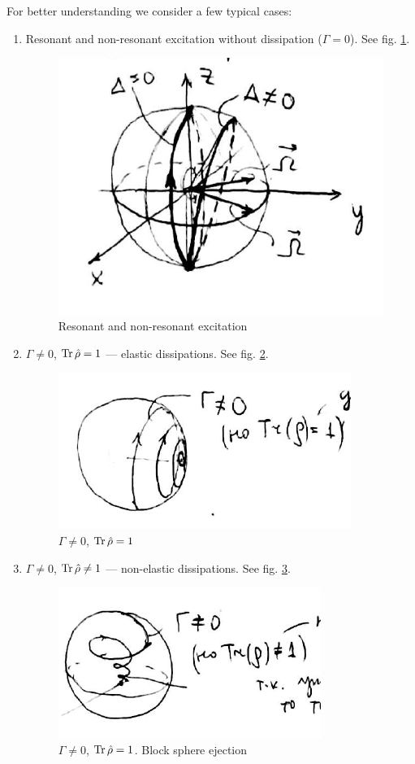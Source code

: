 For better understanding we consider a few typical cases: 
\begin{enumerate}
	\item Resonant and non-resonant excitation without dissipation ($\Gamma = 0$). See fig. \ref{fig:bloch1}.
	\begin{figure}[h!]
		\centering
		\includegraphics[width=0.7\linewidth]{fig/L5/bloch1}
		\caption{Resonant and non-resonant excitation}
		\label{fig:bloch1}
	\end{figure}
	\item $\Gamma \neq 0$, $\operatorname{Tr} \hat{\rho} = 1$ --- elastic dissipations. See fig. \ref{fig:gammanenol1}.
	\begin{figure}[h!]
		\centering
		\includegraphics[width=0.6\linewidth]{fig/L5/gamma_ne_nol_1}
		\caption{$\Gamma \neq 0$, $\operatorname{Tr} \hat{\rho} = 1$}
		\label{fig:gammanenol1}
	\end{figure}
	\item $\Gamma \neq 0$, $\operatorname{Tr} \hat{\rho} \neq 1$ --- non-elastic dissipations. See fig. \ref{fig:gammanenol}.
	\begin{figure}[h!]
		\centering
		\includegraphics[width=0.6\linewidth]{fig/L5/gamma_ne_nol}
		\caption{$\Gamma \neq 0$, $\operatorname{Tr} \hat{\rho} = 1$. Block sphere ejection}
		\label{fig:gammanenol}
	\end{figure}
	
	
\end{enumerate}

